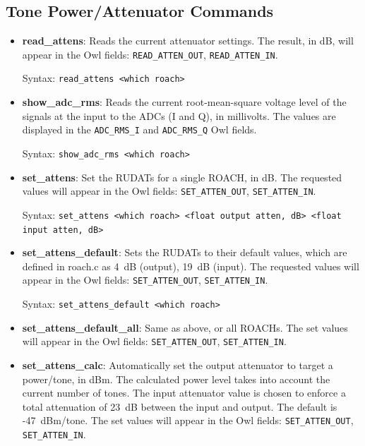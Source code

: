 \subsection{Tone Power/Attenuator Commands}
\begin{itemize}[leftmargin=*,label={}]

\item \textbf{read\_attens}: Reads the current attenuator settings. The result, in dB, will appear in the Owl fields: \texttt{READ\_ATTEN\_OUT}, \texttt{READ\_ATTEN\_IN}.

Syntax: \texttt{read\_attens <which roach>}

\item \textbf{show\_adc\_rms}: Reads the current root-mean-square voltage level of the signals at the input to the ADCs (I and Q), in millivolts. The values are displayed in the \texttt{ADC\_RMS\_I} and \texttt{ADC\_RMS\_Q} Owl fields.

Syntax: \texttt{show\_adc\_rms <which roach>}

\item \textbf{set\_attens}: Set the RUDATs for a single ROACH, in dB. The requested values will appear in the Owl fields: \texttt{SET\_ATTEN\_OUT}, \texttt{SET\_ATTEN\_IN}.

Syntax: \texttt{set\_attens <which roach> <float output atten, dB> <float input atten, dB>}

\item \textbf{set\_attens\_default}: Sets the RUDATs to their default values, which are defined in roach.c as 4~dB (output), 19~dB (input). The requested values will appear in the Owl fields: \texttt{SET\_ATTEN\_OUT}, \texttt{SET\_ATTEN\_IN}.

Syntax: \texttt{set\_attens\_default <which roach>}

\item \textbf{set\_attens\_default\_all}: Same as above, or all ROACHs. The set values will appear in the Owl fields: \texttt{SET\_ATTEN\_OUT}, \texttt{SET\_ATTEN\_IN}.

\item \textbf{set\_attens\_calc}: Automatically set the output attenuator to target a power/tone, in dBm. The calculated power level takes into account the current number of tones. The input attenuator value is chosen to enforce a total attenuation of 23~dB between the input and output. The default is -47~dBm/tone. The set values will appear in the Owl fields: \texttt{SET\_ATTEN\_OUT}, \texttt{SET\_ATTEN\_IN}.


\end{itemize}
